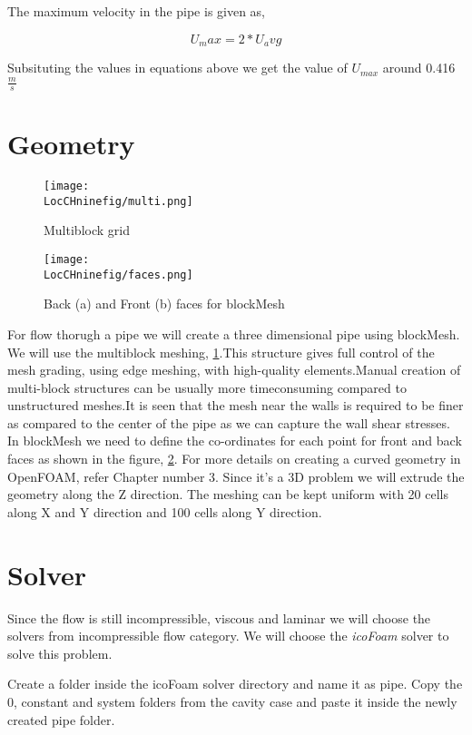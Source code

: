 \flushleft The maximum velocity in the pipe is given as,

\begin{equation}
U_max = 2*U_avg
\end{equation}

\flushleft Subsituting the values in equations above we get the value of $U_{max}$ around 0.416 $\frac{m}{s}$

\section{Geometry}

\begin{figure}[h]  
\centering
\texttt{[image: \\LocCHninefig/multi.png]}
\caption{Multiblock grid}
\label{multi}
\end{figure}

\begin{figure}[h]  
\centering
\texttt{[image: \\LocCHninefig/faces.png]}
\caption{Back (a) and Front (b) faces for blockMesh}
\label{faces}
\end{figure}

For flow thorugh a pipe we will create a three dimensional pipe using blockMesh. We will use the multiblock meshing, \ref{multi}.This structure gives full control of the mesh grading, using edge meshing, with high-quality elements.Manual creation of multi-block structures can be usually more timeconsuming compared to unstructured meshes.It is seen that the mesh near the walls is required to be finer as compared to the center of the pipe as we can capture the wall shear stresses. In blockMesh we need to define the co-ordinates for each point for front and back faces as shown in the figure, \ref{faces}. For more details on creating a curved geometry in OpenFOAM, refer Chapter number 3. Since it's a 3D problem we will extrude the geometry along the Z direction. The meshing can be kept uniform with 20 cells along X and Y direction and 100 cells along Y direction.

\section{Solver}

Since the flow is still incompressible, viscous and laminar we will choose the solvers from incompressible flow category. We will choose the \textit{icoFoam} solver to solve this problem. \newline

\flushleft Create a folder inside the icoFoam solver directory and name it as pipe. Copy the 0, constant and system folders from the cavity case and paste it inside the newly created pipe folder. 

